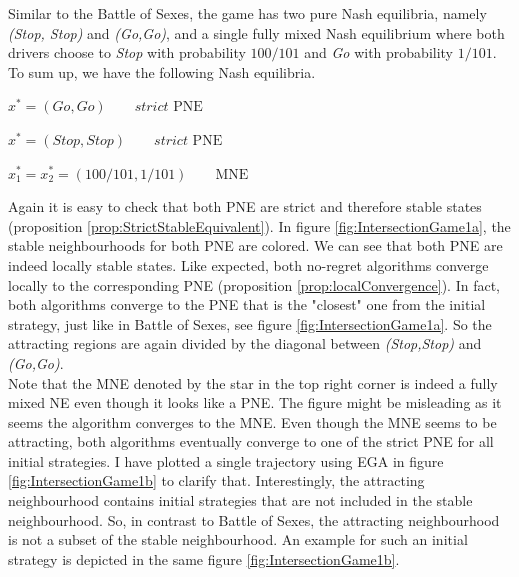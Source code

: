 Similar to the Battle of Sexes, the game has two pure Nash equilibria, namely \textit{(Stop, Stop)} and \textit{(Go,Go)}, and a single fully mixed Nash equilibrium where both drivers choose to \textit{Stop} with probability $100/101$ and \textit{Go} with probability $1/101$. To sum up, we have the following Nash equilibria.

\begin{description}\centering
    \item $x^{*} = (Go,Go) \qquad \textit{strict }\text{PNE}$
    \item $x^{*} = (Stop,Stop) \qquad \textit{strict }\text{PNE}$
    \item $x_{1}^* = x_{2}^* = (100/101,1/101) \qquad \text{MNE}$
\end{description}

Again it is easy to check that both PNE are strict and therefore stable states (proposition \ref{prop:StrictStableEquivalent}). In figure \ref{fig:IntersectionGame1a}, the stable neighbourhoods for both PNE are colored. We can see that both PNE are indeed locally stable states. Like expected, both no-regret algorithms converge locally to the corresponding PNE (proposition \ref{prop:localConvergence}). In fact, both algorithms converge to the PNE that is the "closest" one from the initial strategy, just like in Battle of Sexes, see figure \ref{fig:IntersectionGame1a}. So the attracting regions are again divided by the diagonal between \textit{(Stop,Stop)} and \textit{(Go,Go)}. \\

Note that the MNE denoted by the star in the top right corner is indeed a fully mixed NE even though it looks like a PNE. The figure might be misleading as it seems the algorithm converges to the MNE. Even though the MNE seems to be attracting, both algorithms eventually converge to one of the strict PNE for all initial strategies. I have plotted a single trajectory using EGA in figure \ref{fig:IntersectionGame1b} to clarify that. Interestingly, the attracting neighbourhood contains initial strategies that are not included in the stable neighbourhood. So, in contrast to Battle of Sexes, the attracting neighbourhood is not a subset of the stable neighbourhood. An example for such an initial strategy is depicted in the same figure \ref{fig:IntersectionGame1b}.

